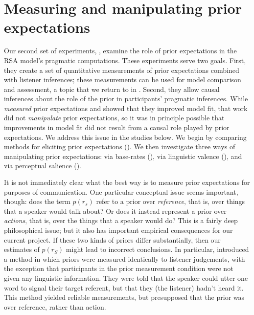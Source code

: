 \section{Measuring and manipulating prior expectations}
\label{sec:prior}

Our second set of experiments, , examine the role of prior expectations in the RSA model's pragmatic computations. These experiments serve two goals. First, they create a set of quantitative measurements of prior expectations combined with listener inferences; these measurements can be used for model comparison and assessment, a topic that we return to in . Second, they allow causal inferences about the role of the prior in participants' pragmatic inferences. While  \emph{measured} prior expectations and showed that they improved model fit, that work did not \emph{manipulate} prior expectations, so it was in principle possible that improvements in model fit did not result from a causal role played by prior expectations. We address this issue in the studies below. We begin by comparing methods for eliciting prior expectations (). We then investigate three ways of manipulating prior expectations: via base-rates (), via linguistic valence (), and via perceptual salience (). 

It is not immediately clear what the best way is to measure prior expectations for purposes of communication. One particular conceptual issue seems important, though: does the term $p(r_s)$ refer to a prior over \emph{reference}, that is, over things that a speaker would talk about? Or does it instead represent a prior over \emph{actions}, that is, over the things that a speaker would do? This is a fairly deep philosophical issue; but it also has important empirical consequences for our current project. If these two kinds of priors differ substantially, then our estimates of $p(r_S)$ might lead to incorrect conclusions. In particular,  introduced a method in which priors were measured identically to listener judgements, with the exception that participants in the prior measurement condition were not given any linguistic information. They were told that the speaker could utter one word to signal their target referent, but that they (the listener) hadn't heard it. This method yielded reliable measurements, but presupposed that the prior was over reference, rather than action. 

